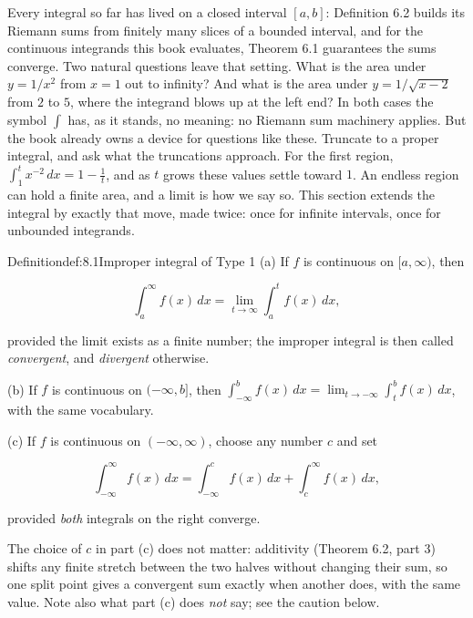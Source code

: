 \documentclass[a4paper,12pt,oneside]{memoir}
\begin{document}
Every integral so far has lived on a closed interval \([a, b]\): Definition 6.2 builds its Riemann sums from finitely many slices of a bounded interval, and for the continuous integrands this book evaluates, Theorem 6.1 guarantees the sums converge. Two natural questions leave that setting. What is the area under \(y = 1/x^{2}\) from \(x = 1\) out to infinity? And what is the area under \(y = 1/\sqrt{x - 2}\) from \(2\) to \(5\), where the integrand blows up at the left end? In both cases the symbol \(\int\) has, as it stands, no meaning: no Riemann sum machinery applies. But the book already owns a device for questions like these. Truncate to a proper integral, and ask what the truncations approach. For the first region, \(\int_{1}^{t} x^{-2}\,dx = 1 - \tfrac{1}{t}\), and as \(t\) grows these values settle toward \(1\). An endless region can hold a finite area, and a limit is how we say so. This section extends the integral by exactly that move, made twice: once for infinite intervals, once for unbounded integrands.

\begin{envdefinition}{Definition}{def:8.1}{Improper integral of Type 1}
(a) If \(f\) is continuous on \([a, \infty)\), then

\[ \int_{a}^{\infty} f(x)\,dx = \lim_{t \to \infty} \int_{a}^{t} f(x)\,dx, \]

provided the limit exists as a finite number; the improper integral is then called \emph{convergent}, and \emph{divergent} otherwise.

(b) If \(f\) is continuous on \((-\infty, b]\), then \(\displaystyle\int_{-\infty}^{b} f(x)\,dx = \lim_{t \to -\infty} \int_{t}^{b} f(x)\,dx\), with the same vocabulary.

(c) If \(f\) is continuous on \((-\infty, \infty)\), choose any number \(c\) and set

\[ \int_{-\infty}^{\infty} f(x)\,dx = \int_{-\infty}^{c} f(x)\,dx + \int_{c}^{\infty} f(x)\,dx, \]

provided \emph{both} integrals on the right converge.
\end{envdefinition}
The choice of \(c\) in part (c) does not matter: additivity (Theorem 6.2, part 3) shifts any finite stretch between the two halves without changing their sum, so one split point gives a convergent sum exactly when another does, with the same value. Note also what part (c) does \emph{not} say; see the caution below.
\end{document}
